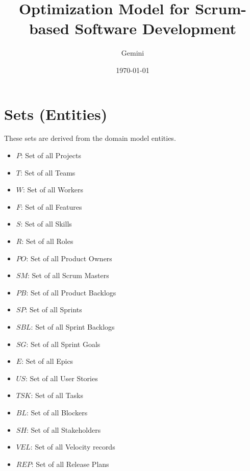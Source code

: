 \documentclass[11pt]{article}
\title{\textbf{Optimization Model for Scrum-based Software Development}}
\author{Gemini}
\date{\today}
\begin{document}
\maketitle
\tableofcontents
\newpage

\section{Sets (Entities)}
These sets are derived from the domain model entities.
\begin{itemize}
    \item $P$: Set of all Projects
    \item $T$: Set of all Teams
    \item $W$: Set of all Workers
    \item $F$: Set of all Features
    \item $S$: Set of all Skills
    \item $R$: Set of all Roles
    \item $PO$: Set of all Product Owners
    \item $SM$: Set of all Scrum Masters
    \item $PB$: Set of all Product Backlogs
    \item $SP$: Set of all Sprints
    \item $SBL$: Set of all Sprint Backlogs
    \item $SG$: Set of all Sprint Goals
    \item $E$: Set of all Epics
    \item $US$: Set of all User Stories
    \item $TSK$: Set of all Tasks
    \item $BL$: Set of all Blockers
    \item $SH$: Set of all Stakeholders
    \item $VEL$: Set of all Velocity records
    \item $REP$: Set of all Release Plans
\end{itemize}
\end{document}
